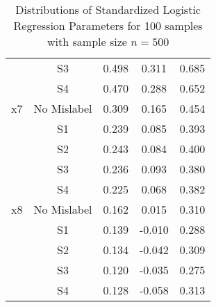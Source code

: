 \documentclass{article}
\begin{document}
\begin{table}
\begin{tabular}{ c c c c c}
&S3&0.498&0.311&0.685\\
&S4&0.470&0.288&0.652\\
\midrule
x7&No Mislabel&0.309&0.165&0.454\\
&S1&0.239&0.085&0.393\\
&S2&0.243&0.084&0.400\\
&S3&0.236&0.093&0.380\\
&S4&0.225&0.068&0.382\\
\midrule
x8&No Mislabel&0.162&0.015&0.310\\
&S1&0.139&-0.010&0.288\\
&S2&0.134&-0.042&0.309\\
&S3&0.120&-0.035&0.275\\
&S4&0.128&-0.058&0.313\\
\bottomrule
\end{tabular}
\caption{Distributions of Standardized Logistic Regression Parameters for 100 samples with sample size $n=500$}\label{simresult}
\end{table}
\end{document}
